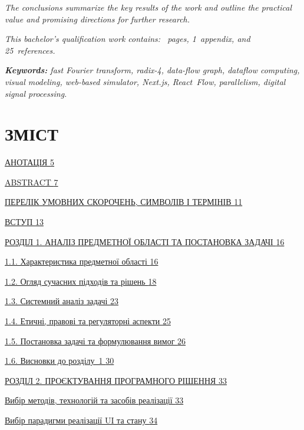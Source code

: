 \emph{The conclusions summarize the key results of the work and outline
the practical value and promising directions for further research.}

\emph{This bachelor's qualification work contains: ~pages, 1~appendix,
and 25~references.}

\emph{\textbf{Keywords:} fast Fourier transform, radix-4, data-flow
graph, dataflow computing, visual modeling, web-based simulator,
Next.js, React~Flow, parallelism, digital signal processing.}

\emph{\hfill\break
}

\section{\texorpdfstring{\textbf{ЗМІСТ}}{ЗМІСТ}}\label{ux437ux43cux456ux441ux442}

\hyperref[_Toc229682900]{АНОТАЦІЯ \hyperref[_Toc229682900]{5}}

\hyperref[_Toc229682901]{ABSTRACT \hyperref[_Toc229682901]{7}}

\hyperref[_Toc229682902]{ПЕРЕЛІК УМОВНИХ СКОРОЧЕНЬ, СИМВОЛІВ І ТЕРМІНІВ
\hyperref[_Toc229682902]{11}}

\hyperref[_Toc229682903]{ВСТУП \hyperref[_Toc229682903]{13}}

\hyperref[_Toc229682904]{РОЗДІЛ 1. АНАЛІЗ ПРЕДМЕТНОЇ ОБЛАСТІ ТА
ПОСТАНОВКА ЗАДАЧІ \hyperref[_Toc229682904]{16}}

\hyperref[_Toc229682905]{1.1. Характеристика предметної області
\hyperref[_Toc229682905]{16}}

\hyperref[_Toc229682906]{1.2. Огляд сучасних підходів та рішень
\hyperref[_Toc229682906]{18}}

\hyperref[_Toc229682907]{1.3. Системний аналіз задачі
\hyperref[_Toc229682907]{23}}

\hyperref[_Toc229682908]{1.4. Етичні, правові та регуляторні аспекти
\hyperref[_Toc229682908]{25}}

\hyperref[_Toc229682909]{1.5. Постановка задачі та формулювання вимог
\hyperref[_Toc229682909]{26}}

\hyperref[_Toc229682910]{1.6. Висновки до розділу~1
\hyperref[_Toc229682910]{30}}

\hyperref[_Toc228121443]{РОЗДІЛ 2. ПРОЄКТУВАННЯ ПРОГРАМНОГО РІШЕННЯ
\hyperref[_Toc228121443]{33}}

\hyperref[_Toc228121444]{Вибір методів, технологій та засобів реалізації
\hyperref[_Toc228121444]{33}}

\hyperref[_Toc228121446]{Вибір парадигми реалізації UI та стану
\hyperref[_Toc228121446]{34}}

